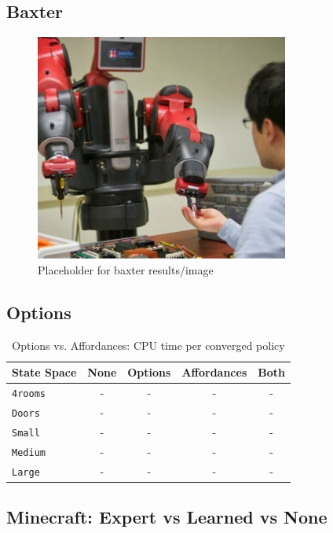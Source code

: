 \documentclass[conference]{IEEEtran}
\begin{document}
\subsection{Baxter}

\begin{figure}[H]
\centering
\includegraphics[scale=0.195]{figures/baxter_temp.jpg}%
  \caption{Placeholder for baxter results/image}
  \label{fig:baxter_results}
\end{figure}

\subsection{Options}

\begin{table}[H]
\centering
\begin{tabular}{ l || c c c c }
  State Space 		& None & Options & Affordances & Both 	 	\\ \hline
  \texttt{4rooms}  	& 	-		&	-	&	-	&	-	\\
  \texttt{Doors}  		& 	-		&	-	&	-	&	-	\\
  \texttt{Small}  		& 	-		&	-	&	-	&	-	\\
  \texttt{Medium}  	& 	-		&	-	&	-	&	-	\\
  \texttt{Large}  		& 	-		&	-	&	-	&	-	\\
\end{tabular}
\caption{Options vs. Affordances: CPU time per converged policy}
\label{table:minecraft_results_cpu}
\end{table}

\subsection{Minecraft: Expert vs Learned vs None}
\end{document}
